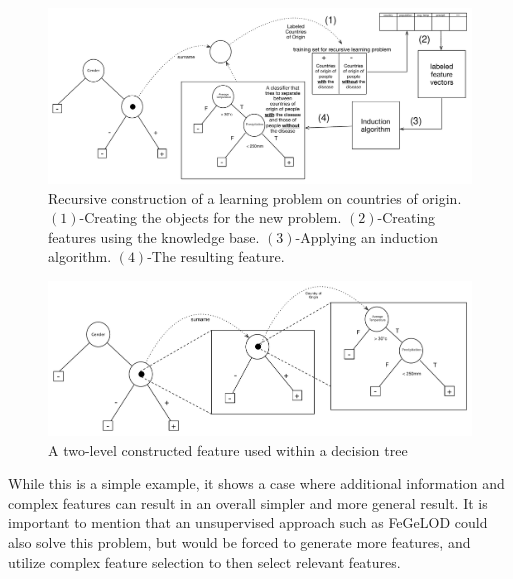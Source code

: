 \documentclass[twoside,11pt]{article}
\theoremstyle{definition}
\begin{document}
\begin{figure}[t]
	\centering
	\includegraphics[width=\linewidth]{fig4_annotated.pdf}
	\caption{Recursive construction of a learning problem on countries of origin. $(1)$-Creating the objects for the new problem. $(2)$-Creating features using the knowledge base. $(3)$-Applying an induction algorithm. $(4)$-The resulting feature.}
	\label{fig:moving_to_lvl2}
\end{figure}

\begin{figure}[t]
	\centering
	\includegraphics[width=\linewidth]{fig3.pdf}
	\caption{A two-level constructed feature used within a decision tree}
	\label{fig:lvl2_tree}
\end{figure}

While this is a simple example, it shows a case where additional information and complex features can result in an overall simpler and more general result. It is important to mention that an unsupervised approach such as FeGeLOD could also solve this problem, but would be forced to generate more features, and utilize complex feature selection to then select relevant features.


\end{document}
